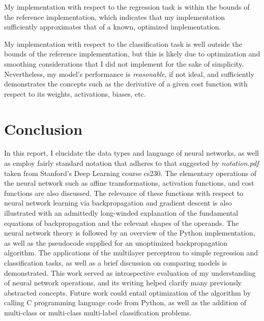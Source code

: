 \documentclass{article}
\begin{document}
\clearpage

My implementation with respect to the regression task is within the bounds
of the  reference implementation, which indicates that
my implementation sufficiently approximates that of a known, optimized
implementation.

My implementation with respect to the classification task is well outside the
bounds of the  reference implementation, but this is likely
due to optimization and smoothing considerations that I did not implement for
the sake of simplicity. Nevertheless, my model's performance is \textit{reasonable},
if not ideal, and sufficiently demonstrates the concepts such as the
derivative of a given cost function with respect to
its weights, activations, biases, etc.

\section{Conclusion}

In this report, I elucidate the data types and language of neural networks, as
well as employ fairly standard notation that adheres to that suggested by
\textit{notation.pdf} taken from Stanford's Deep Learning course cs230. The
elementary operations of the neural network such as affine transformations,
activation functions, and cost functions are also discussed. The relevance of
these functions with respect to neural network learning via backpropagation
and gradient descent is also illustrated with an admittedly long-winded explanation
of the fundamental equations of backpropagation and the relevant shapes of the
operands. The neural network theory is followed by an overview of the Python
implementation, as well as the pseudocode supplied for an unoptimized
backpropagation algorithm. The applications of the multilayer perceptron to
simple regression and classification tasks, as well as a brief discussion on
comparing models is demonstrated. This work served as introspective evaluation
of my understanding of neural network operations, and its writing helped
clarify many previously abstracted concepts. Future work could entail
optimization of the algorithm by calling C programming language code from Python,
as well as the addition of multi-class or multi-class multi-label classification
problems.

\pagebreak
\printbibliography
\end{document}
